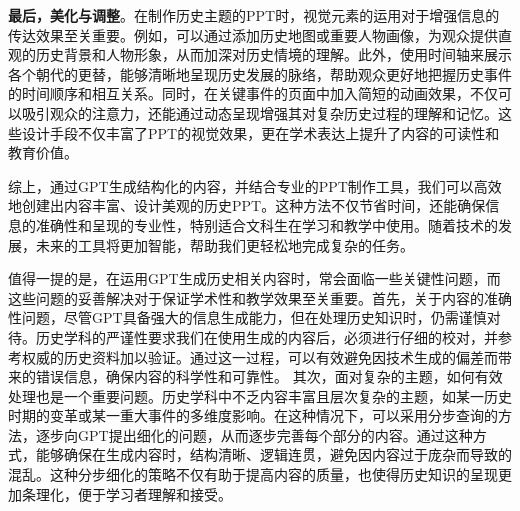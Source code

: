 
\textbf{最后，美化与调整}。在制作历史主题的PPT时，视觉元素的运用对于增强信息的传达效果至关重要。例如，可以通过添加历史地图或重要人物画像，为观众提供直观的历史背景和人物形象，从而加深对历史情境的理解。此外，使用时间轴来展示各个朝代的更替，能够清晰地呈现历史发展的脉络，帮助观众更好地把握历史事件的时间顺序和相互关系。同时，在关键事件的页面中加入简短的动画效果，不仅可以吸引观众的注意力，还能通过动态呈现增强其对复杂历史过程的理解和记忆。这些设计手段不仅丰富了PPT的视觉效果，更在学术表达上提升了内容的可读性和教育价值。

综上，通过GPT生成结构化的内容，并结合专业的PPT制作工具，我们可以高效地创建出内容丰富、设计美观的历史PPT。这种方法不仅节省时间，还能确保信息的准确性和呈现的专业性，特别适合文科生在学习和教学中使用。随着技术的发展，未来的工具将更加智能，帮助我们更轻松地完成复杂的任务。

值得一提的是，在运用GPT生成历史相关内容时，常会面临一些关键性问题，而这些问题的妥善解决对于保证学术性和教学效果至关重要。首先，关于内容的准确性问题，尽管GPT具备强大的信息生成能力，但在处理历史知识时，仍需谨慎对待。历史学科的严谨性要求我们在使用生成的内容后，必须进行仔细的校对，并参考权威的历史资料加以验证。通过这一过程，可以有效避免因技术生成的偏差而带来的错误信息，确保内容的科学性和可靠性。
其次，面对复杂的主题，如何有效处理也是一个重要问题。历史学科中不乏内容丰富且层次复杂的主题，如某一历史时期的变革或某一重大事件的多维度影响。在这种情况下，可以采用分步查询的方法，逐步向GPT提出细化的问题，从而逐步完善每个部分的内容。通过这种方式，能够确保在生成内容时，结构清晰、逻辑连贯，避免因内容过于庞杂而导致的混乱。这种分步细化的策略不仅有助于提高内容的质量，也使得历史知识的呈现更加条理化，便于学习者理解和接受。
